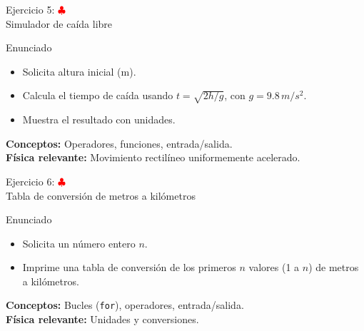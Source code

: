 \documentclass[10pt]{beamer}
\begin{document}
\begin{frame}{Ejercicio 5: \hfill \textcolor{red}{$\clubsuit$} \\ Simulador de caída libre}
  \begin{block}{Enunciado}
    \begin{itemize}
      \item Solicita altura inicial (m).
      \item Calcula el tiempo de caída usando \(t = \sqrt{2h/g}\), con \(g = 9.8\,m/s^2\).
      \item Muestra el resultado con unidades.
    \end{itemize}
  \end{block}
  \textbf{Conceptos:} Operadores, funciones, entrada/salida.\\
  \textbf{Física relevante:} Movimiento rectilíneo uniformemente acelerado.
\end{frame}

\begin{frame}{Ejercicio 6: \hfill \textcolor{red}{$\clubsuit$} \\ Tabla de conversión de metros a kilómetros}
  \begin{block}{Enunciado}
    \begin{itemize}
      \item Solicita un número entero \(n\).
      \item Imprime una tabla de conversión de los primeros \(n\) valores (1 a \(n\)) de metros a kilómetros.
    \end{itemize}
  \end{block}
  \textbf{Conceptos:} Bucles (\texttt{for}), operadores, entrada/salida.\\
  \textbf{Física relevante:} Unidades y conversiones.
\end{frame}
\end{document}
